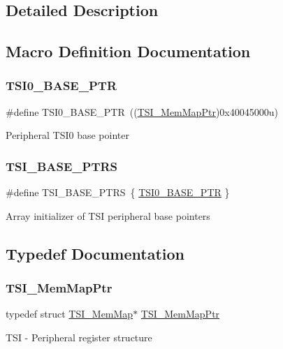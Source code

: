 \subsection{Detailed Description}


\subsection{Macro Definition Documentation}
\mbox{\label{group___t_s_i___peripheral_gaf98ea1cd15559446e0cfc1ae177751f6}} 
\subsubsection{\texorpdfstring{T\+S\+I0\+\_\+\+B\+A\+S\+E\+\_\+\+P\+TR}{TSI0\_BASE\_PTR}}
{\footnotesize\ttfamily \#define T\+S\+I0\+\_\+\+B\+A\+S\+E\+\_\+\+P\+TR~((\hyperlink{group___t_s_i___peripheral_gad1310fedc6b594554cdd760e371de570}{T\+S\+I\+\_\+\+Mem\+Map\+Ptr})0x40045000u)}

Peripheral T\+S\+I0 base pointer \mbox{\label{group___t_s_i___peripheral_gaf0e643a8dc882d5a89dd6bb9a4ca3d16}} 
\subsubsection{\texorpdfstring{T\+S\+I\+\_\+\+B\+A\+S\+E\+\_\+\+P\+T\+RS}{TSI\_BASE\_PTRS}}
{\footnotesize\ttfamily \#define T\+S\+I\+\_\+\+B\+A\+S\+E\+\_\+\+P\+T\+RS~\{ \hyperlink{group___t_s_i___peripheral_gaf98ea1cd15559446e0cfc1ae177751f6}{T\+S\+I0\+\_\+\+B\+A\+S\+E\+\_\+\+P\+TR} \}}

Array initializer of T\+SI peripheral base pointers 

\subsection{Typedef Documentation}
\mbox{\label{group___t_s_i___peripheral_gad1310fedc6b594554cdd760e371de570}} 
\subsubsection{\texorpdfstring{T\+S\+I\+\_\+\+Mem\+Map\+Ptr}{TSI\_MemMapPtr}}
{\footnotesize\ttfamily typedef struct \hyperlink{struct_t_s_i___mem_map}{T\+S\+I\+\_\+\+Mem\+Map}$\ast$ \hyperlink{group___t_s_i___peripheral_gad1310fedc6b594554cdd760e371de570}{T\+S\+I\+\_\+\+Mem\+Map\+Ptr}}

T\+SI -\/ Peripheral register structure 